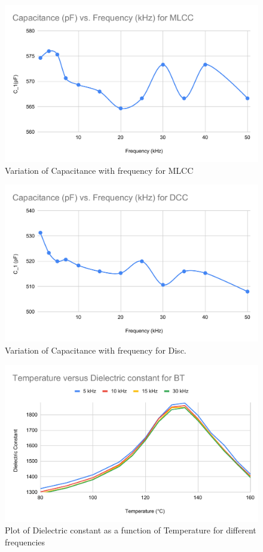 \documentclass[a4paper, amsfonts, amssymb, amsmath, reprint, showkeys, nofootinbib, twoside]{revtex4-1}
\begin{document}
\begin{figure}[H]
	\centering
	\includegraphics[scale=0.4]{m}
	\caption{Variation of Capacitance with frequency for MLCC}
	\label{1}
\end{figure}

\begin{figure}[H]
	\centering
	\includegraphics[scale=0.4]{d}
	\caption{Variation of Capacitance with frequency for Disc.}
	\label{1}
\end{figure}

\begin{figure}[H]
	\centering
	\includegraphics[scale=0.42]{c}
	\caption{Plot of Dielectric constant as a function of Temperature for different frequencies}
	\label{1}
\end{figure}
\end{document}
